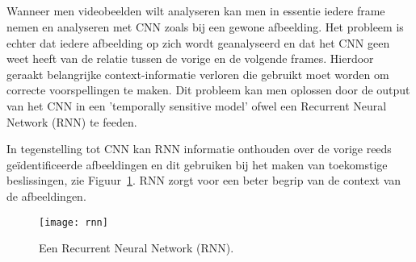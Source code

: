 \subsection{}
\label{sec:recurrent-neural-network}
Wanneer men videobeelden wilt analyseren kan men in essentie iedere frame nemen en analyseren met CNN zoals bij een gewone afbeelding. Het probleem is echter dat iedere afbeelding op zich wordt geanalyseerd en dat het CNN geen weet heeft van de relatie tussen de vorige en de volgende frames. Hierdoor geraakt belangrijke context-informatie verloren die gebruikt moet worden om correcte voorspellingen te maken.
Dit probleem kan men oplossen door de output van het CNN in een 'temporally sensitive model' ofwel een Recurrent Neural Network (RNN) te feeden.

In tegenstelling tot CNN kan RNN informatie onthouden over de vorige reeds geïdentificeerde afbeeldingen en dit gebruiken bij het maken van toekomstige beslissingen, zie Figuur~\ref{fig:rnn}. RNN zorgt voor een beter begrip van de context van de afbeeldingen.

\begin{figure}
    \centering
    \texttt{[image: rnn]}
    \caption{Een Recurrent Neural Network (RNN). \autocite{Mishra2018}}
    \label{fig:rnn}
\end{figure}